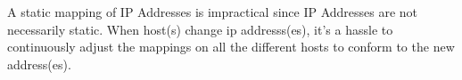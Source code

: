 A static mapping of IP Addresses is impractical since IP Addresses are not necessarily static. When host(s) change ip addresss(es), it's a hassle to continuously adjust the mappings on all the different hosts to conform to the new address(es).